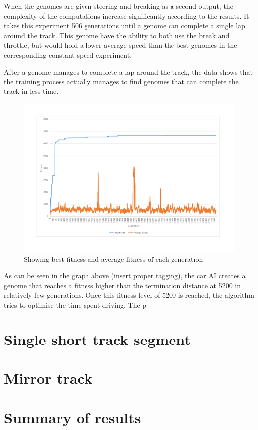 When the genomes are given steering and breaking as a second output, the complexity of the computations increase significantly according to the results. It takes this experiment 506 generations until a genome can complete a single lap around the track. This genome have the ability to both use the break and throttle, but would hold a lower average speed than the best genomes in the corresponding constant speed experiment.

After a genome manages to complete a lap around the track, the data shows that the training process actually manages to find genomes that can complete the track in less time. 


\begin{figure}[h]
\includegraphics[width=\textwidth]{report/images/graphs/fitness}
\centering
\caption{Showing best fitness and average fitness of each generation}
\end{figure}

As can be seen in the graph above (insert proper tagging), the car AI creates a genome that reaches a fitness higher than the termination distance at 5200 in relatively few generations. Once this fitness level of 5200 is reached, the algorithm tries to optimise the time spent driving. The p

\section{Single short track segment}


\section{Mirror track}




\section{Summary of results}
